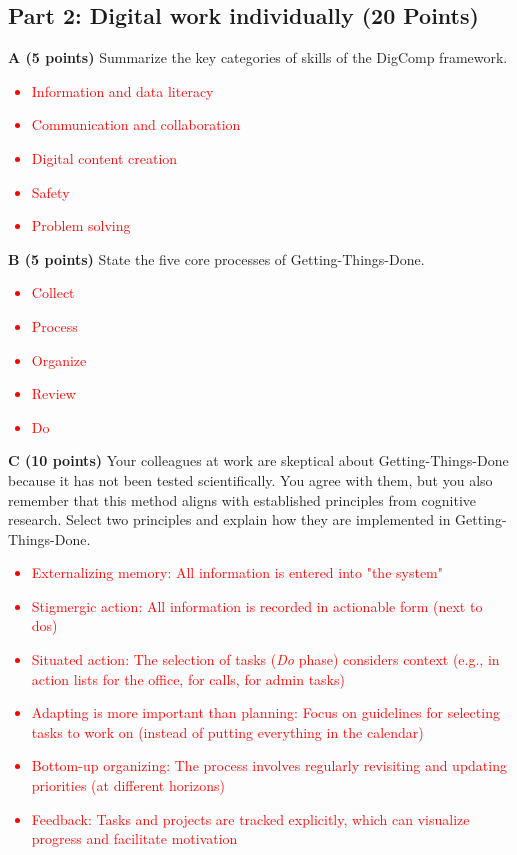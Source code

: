 \documentclass[12pt]{scrartcl}
\begin{document}
\subsection*{Part 2: Digital work individually (20 Points)}

\textbf{A (5 points)} Summarize the key categories of skills of the DigComp framework.

\textcolor{red}{
\begin{itemize}
	\item Information and data literacy
	\item Communication and collaboration
	\item Digital content creation
	\item Safety
	\item Problem solving
\end{itemize}	
}

\vspace{0.3cm}

\textbf{B (5 points)} State the five core processes of Getting-Things-Done.

\textcolor{red}{
	\begin{itemize}
		\item Collect
		\item Process
		\item Organize
		\item Review
		\item Do
	\end{itemize}	
}

\newpage

\textbf{C (10 points)} Your colleagues at work are skeptical about Getting-Things-Done because it has not been tested scientifically. You agree with them, but you also remember that this method aligns with established principles from cognitive research. Select two principles and explain how they are implemented in Getting-Things-Done.

\textcolor{red}{
	\begin{itemize}
		\item Externalizing memory: All information is entered into "the system"
		\item Stigmergic action: All information is recorded in actionable form (next to dos)
		\item Situated action: The selection of tasks (\textit{Do} phase) considers context (e.g., in action lists for the office, for calls, for admin tasks)
		\item Adapting is more important than planning: Focus on guidelines for selecting tasks to work on (instead of putting everything in the calendar)
		\item Bottom-up organizing: The process involves regularly revisiting and updating priorities (at different horizons)
		\item Feedback: Tasks and projects are tracked explicitly, which can visualize progress and facilitate motivation
	\end{itemize}	
}
\end{document}
